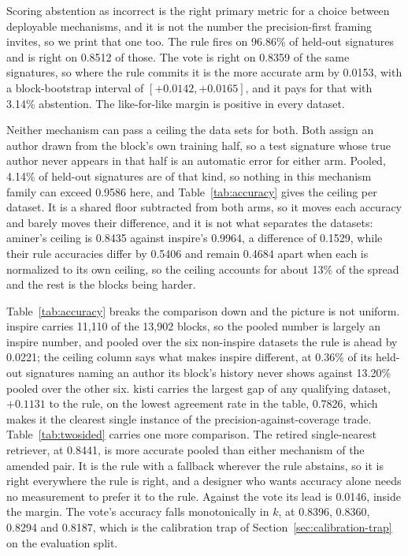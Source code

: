 \documentclass[11pt]{article}
\begin{document}
Scoring abstention as incorrect is the right primary metric for a choice
between deployable mechanisms, and it is not the number the precision-first
framing invites, so we print that one too. The rule fires on 96.86\% of
held-out signatures and is right on 0.8512 of those. The vote is right on
0.8359 of the same signatures, so where the rule commits it is the more
accurate arm by 0.0153, with a block-bootstrap interval of
$[+0.0142, +0.0165]$, and it pays for that with 3.14\% abstention. The
like-for-like margin is positive in every dataset.

Neither mechanism can pass a ceiling the data sets for both. Both assign an
author drawn from the block's own training half, so a test signature whose
true author never appears in that half is an automatic error for either arm.
Pooled, 4.14\% of held-out signatures are of that kind, so nothing in this
mechanism family can exceed 0.9586 here, and Table~\ref{tab:accuracy} gives
the ceiling per dataset. It is a shared floor subtracted from both arms, so it
moves each accuracy and barely moves their difference, and it is not what
separates the datasets: aminer's ceiling is 0.8435 against inspire's 0.9964,
a difference of 0.1529, while their rule accuracies differ by 0.5406 and
remain 0.4684 apart when each is normalized to its own ceiling, so the ceiling
accounts for about 13\% of the spread and the rest is the blocks being
harder.

Table~\ref{tab:accuracy} breaks the comparison down and the picture is not
uniform. inspire carries 11{,}110 of the 13{,}902 blocks, so the pooled number
is largely an inspire number, and pooled over the six non-inspire datasets the
rule is ahead by 0.0221; the ceiling column says what makes inspire different,
at 0.36\% of its held-out signatures naming an author its block's history
never shows against 13.20\% pooled over the other six. kisti carries the
largest gap of any qualifying dataset, $+0.1131$ to the rule, on the lowest
agreement rate in the table, 0.7826, which makes it the clearest single
instance of the precision-against-coverage trade.
Table~\ref{tab:twosided} carries one more comparison. The
retired single-nearest retriever, at 0.8441, is more accurate pooled than
either mechanism of the amended pair. It is the rule with a fallback wherever
the rule abstains, so it is right everywhere the rule is right, and a designer
who wants accuracy alone needs no measurement to prefer it to the rule.
Against the vote its lead is 0.0146, inside the margin. The vote's accuracy falls
monotonically in $k$, at 0.8396, 0.8360, 0.8294 and 0.8187, which is the
calibration trap of Section~\ref{sec:calibration-trap} on the evaluation
split.
\end{document}
